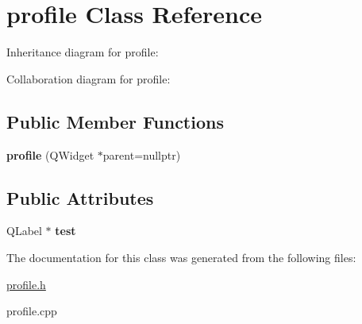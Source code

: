 \hypertarget{classprofile}{}\section{profile Class Reference}
\label{classprofile}


Inheritance diagram for profile\+:


Collaboration diagram for profile\+:
\subsection*{Public Member Functions}
\begin{DoxyCompactItemize}
\item 
\mbox{\label{classprofile_a7baee86e4f3f3f23cebdc382ca9f2243}} 
{\bfseries profile} (Q\+Widget $\ast$parent=nullptr)
\end{DoxyCompactItemize}
\subsection*{Public Attributes}
\begin{DoxyCompactItemize}
\item 
\mbox{\label{classprofile_a53ece61f55f61861318d4895c92bca46}} 
Q\+Label $\ast$ {\bfseries test}
\end{DoxyCompactItemize}


The documentation for this class was generated from the following files\+:\begin{DoxyCompactItemize}
\item 
\hyperlink{profile_8h}{profile.\+h}\item 
profile.\+cpp\end{DoxyCompactItemize}
